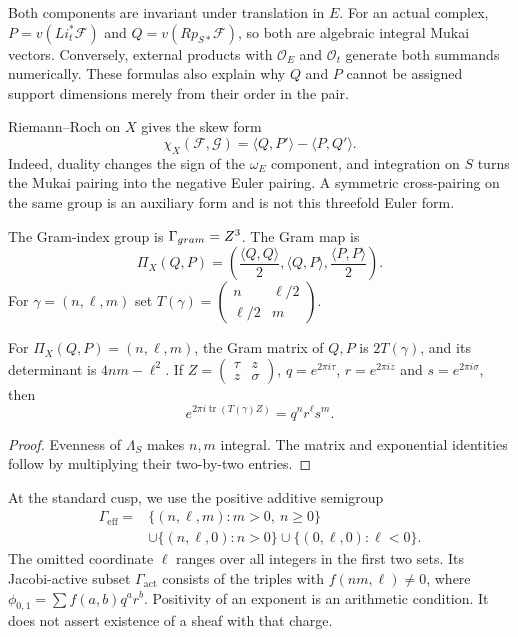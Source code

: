 Both components are invariant under translation in $E$.  For an
actual complex, $P=v(Li_t^*\mathcal F)$ and
$Q=v(Rp_{S*}\mathcal F)$, so both are algebraic integral Mukai
vectors.  Conversely, external products with $\mathcal O_E$ and
$\mathcal O_t$ generate both summands numerically.  These formulas
also explain why $Q$ and $P$ cannot be assigned support dimensions
merely from their order in the pair.

Riemann--Roch on $X$ gives the skew form
\[
\chi_X(\mathcal F,\mathcal G)
=\langle Q,P'\rangle-\langle P,Q'\rangle.
\]
Indeed, duality changes the sign of the $\omega_E$ component, and
integration on $S$ turns the Mukai pairing into the negative Euler
pairing.  A symmetric cross-pairing on the same group is an auxiliary
form and is not this threefold Euler form.

\begin{definition}
\label{def:gram-index-lattice}
\label{def:gram-map-cocycle}
The Gram-index group is $\Gamma_{gram}=Z^3$.  The Gram map
is
\[
\Pi_X(Q,P)=\left(\frac{\langle Q,Q\rangle}{2},
\langle Q,P\rangle,\frac{\langle P,P\rangle}{2}\right).
\]
For $\gamma=(n,\ell,m)$ set
$T(\gamma)=\left(\begin{smallmatrix}n&\ell/2\\\ell/2&m\end{smallmatrix}\right)$.
\end{definition}

\begin{proposition}
\label{prop:gram-matrix-convention}
For $\Pi_X(Q,P)=(n,\ell,m)$, the Gram matrix of $Q,P$ is $2T(\gamma)$,
and its determinant is $4nm-\ell^2$.  If
$Z=\left(\begin{smallmatrix}\tau&z\\z&\sigma\end{smallmatrix}\right)$,
$q=e^{2\pi i\tau}$, $r=e^{2\pi iz}$ and $s=e^{2\pi i\sigma}$, then
\[
e^{2\pi i\operatorname{tr}(T(\gamma)Z)}=q^nr^\ell s^m.
\]
\end{proposition}

\begin{proof}
Evenness of $\Lambda_S$ makes $n,m$ integral.  The matrix and
exponential identities follow by multiplying their two-by-two entries.
\end{proof}

At the standard cusp, we use the positive additive semigroup
\[
\begin{split}
\Gamma_{\mathrm{eff}}={}&\{(n,\ell,m):m>0,\ n\ge0\}\\
&\cup\{(n,\ell,0):n>0\}
\cup\{(0,\ell,0):\ell<0\}.
\end{split}
\]
The omitted coordinate $\ell$ ranges over all integers in the first
two sets.  Its Jacobi-active subset $\Gamma_{\mathrm{act}}$ consists
of the triples with $f(nm,\ell)\ne0$, where
$\phi_{0,1}=\sum f(a,b)q^ar^b$.  Positivity of an exponent is an
arithmetic condition.  It does not assert existence of a sheaf with
that charge.

